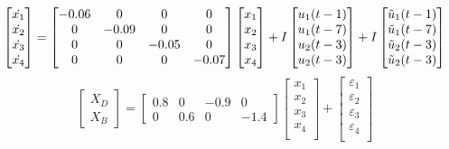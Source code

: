 \begin{equation}
    \begin{bmatrix}
        \dot{x_1} \\
        \dot{x_2} \\
        \dot{x_3} \\
        \dot{x_4} 
    \end{bmatrix}
    =
    \begin{bmatrix}
        -0.06     &     0     &     0     &     0 \\
        0           &  -0.09  &     0     &     0 \\
        0           &     0     &   -0.05 &     0 \\
        0           &     0     &     0     &  -0.07
    \end{bmatrix}
    \begin{bmatrix}
        x_1 \\
        x_2 \\
        x_3 \\
        x_4 
    \end{bmatrix}
    + \\ I
    \begin{bmatrix}
        u_1(t - 1) \\
        u_1(t - 7) \\
        u_2(t - 3) \\
        u_2(t - 3)
    \end{bmatrix}
    + I
    \begin{bmatrix}
        \Tilde{u}_1(t - 1) \\
        \Tilde{u}_1(t - 7) \\
        \Tilde{u}_2(t - 3) \\
        \Tilde{u}_2(t - 3)
    \end{bmatrix}
    \label{eq: x_ss_eq1}
\end{equation}
\begin{equation}
    \begin{bmatrix}
    X_D \\
    X_B
    \end{bmatrix}
    =
    \begin{bmatrix}
    0.8 & 0 & -0.9 & 0 \\
    0 & 0.6 & 0 & -1.4
    \end{bmatrix}
    \begin{bmatrix}
    x_1 \\
    x_2 \\
    x_3 \\
    x_4 \\
    \end{bmatrix}
    +
    \begin{bmatrix}
    \varepsilon_1 \\
    \varepsilon_2 \\
    \varepsilon_3 \\
    \varepsilon_4 \\
    \end{bmatrix}
    \label{eq: x_ss_eq2}
\end{equation}

